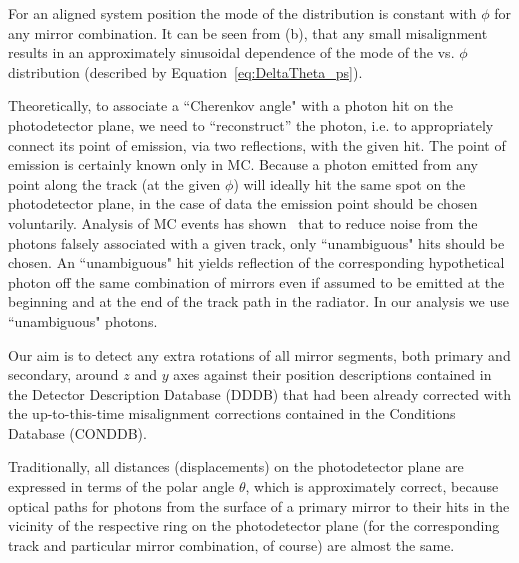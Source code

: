 For an aligned system position the mode of the \deltatheta distribution is
constant with $\phi$ for any mirror combination. It can be seen from
 (b), that any small  misalignment results in
an approximately sinusoidal dependence of the mode of the \deltatheta vs. $\phi$
distribution (described by Equation~\ref{eq:DeltaTheta_ps}).

Theoretically, to associate a ``Cherenkov angle" with a photon hit on the
photodetector plane, we need to ``reconstruct'' the photon, i.e. to
appropriately connect its point of emission, via two reflections, with the given
hit. The point of emission is certainly known only in MC. Because a photon
emitted from any point along the track (at the given $\phi$) will ideally hit
the same spot on the photodetector plane, in the case of data the emission point
should be chosen voluntarily. Analysis of MC events has
shown~\cite{Gorisek:1999td} that to reduce noise from the photons falsely
associated with a given track, only ``unambiguous" hits should be chosen. An
``unambiguous" hit yields reflection of the corresponding hypothetical photon
off the same combination of mirrors even if assumed to be emitted at the
beginning and at the end of the track path in the radiator. In our analysis we
use ``unambiguous" photons.

Our aim is to detect any extra rotations of all mirror segments, both primary
and secondary, around $z$ and $y$ axes against their position descriptions
contained in the Detector Description Database (DDDB) that had been already
corrected with the up-to-this-time misalignment corrections contained in the
Conditions Database (CONDDB).

Traditionally, all distances (displacements) on the photodetector plane are
expressed in terms of the polar angle $\theta$, which is approximately correct,
because optical paths for photons from the surface of a primary mirror to their
hits in the vicinity of the respective ring on the photodetector plane (for the
corresponding track and particular mirror combination, of course) are almost the
same.

